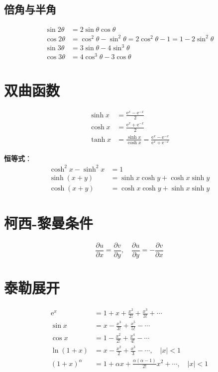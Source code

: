\subsection{倍角与半角}
\begin{align}
    \sin 2\theta &= 2\sin\theta\cos\theta \\
    \cos 2\theta &= \cos^2\theta - \sin^2\theta = 2\cos^2\theta - 1 = 1 - 2\sin^2\theta \\
    \sin 3\theta &= 3\sin\theta - 4\sin^3\theta \\
    \cos 3\theta &= 4\cos^3\theta - 3\cos\theta
\end{align}

\section{双曲函数}
\begin{align}
    \sinh x &= \frac{\mathrm{e}^x - \mathrm{e}^{-x}}{2} \\
    \cosh x &= \frac{\mathrm{e}^x + \mathrm{e}^{-x}}{2} \\
    \tanh x &= \frac{\sinh x}{\cosh x} = \frac{\mathrm{e}^x - \mathrm{e}^{-x}}{\mathrm{e}^x + \mathrm{e}^{-x}}
\end{align}

\textbf{恒等式}：
\begin{align}
    \cosh^2 x - \sinh^2 x &= 1 \\
    \sinh(x+y) &= \sinh x\cosh y + \cosh x\sinh y \\
    \cosh(x+y) &= \cosh x\cosh y + \sinh x\sinh y
\end{align}

\section{柯西-黎曼条件}
\begin{zhongyao}[柯西-黎曼条件]
\[
    \frac{\partial u}{\partial x} = \frac{\partial v}{\partial y}, \quad \frac{\partial u}{\partial y} = -\frac{\partial v}{\partial x}
\]
\end{zhongyao}

\section{泰勒展开}
\begin{align}
    \mathrm{e}^x &= 1 + x + \frac{x^2}{2!} + \frac{x^3}{3!} + \cdots \\
    \sin x &= x - \frac{x^3}{3!} + \frac{x^5}{5!} - \cdots \\
    \cos x &= 1 - \frac{x^2}{2!} + \frac{x^4}{4!} - \cdots \\
    \ln(1+x) &= x - \frac{x^2}{2} + \frac{x^3}{3} - \cdots, \quad |x| < 1 \\
    (1+x)^\alpha &= 1 + \alpha x + \frac{\alpha(\alpha-1)}{2!}x^2 + \cdots, \quad |x| < 1
\end{align}

